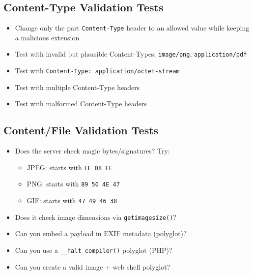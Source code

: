 \documentclass[11pt]{article}
\begin{document}
\subsection{Content-Type Validation Tests}

\begin{checklistbox}
\begin{itemize}
    \item[\checkmark] Change only the part \texttt{Content-Type} header to an allowed value while keeping a malicious extension
    \item[\checkmark] Test with invalid but plausible Content-Types: \texttt{image/png}, \texttt{application/pdf}
    \item[\checkmark] Test with \texttt{Content-Type: application/octet-stream}
    \item[\checkmark] Test with multiple Content-Type headers
    \item[\checkmark] Test with malformed Content-Type headers
\end{itemize}
\end{checklistbox}

\subsection{Content/File Validation Tests}

\begin{checklistbox}
\begin{itemize}
    \item[\checkmark] Does the server check magic bytes/signatures? Try:
    \begin{itemize}
        \item JPEG: starts with \texttt{FF D8 FF}
        \item PNG: starts with \texttt{89 50 4E 47}
        \item GIF: starts with \texttt{47 49 46 38}
    \end{itemize}
    \item[\checkmark] Does it check image dimensions via \texttt{getimagesize()}?
    \item[\checkmark] Can you embed a payload in EXIF metadata (polyglot)?
    \item[\checkmark] Can you use a \texttt{\_\_halt\_compiler()} polyglot (PHP)?
    \item[\checkmark] Can you create a valid image + web shell polyglot?
\end{itemize}
\end{checklistbox}
\end{document}

